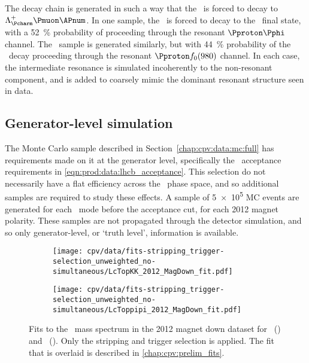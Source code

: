 The decay chain is generated in such a way that the \PLambdab\ is forced to 
decay to $\PLambdac\Pmuon\APnum$.
In one sample, the \PLambdac\ is forced to decay to the \pKK\ final state, with 
a \SI{52}{\percent} probability of proceeding through the resonant 
$\Pproton\Pphi$ channel.
The \ppipi\ sample is generated similarly, but with \SI{44}{\percent} 
probability of the \LcToppipi\ decay proceeding through the resonant $\Pproton 
f_{0}(980)$ channel.
In each case, the intermediate resonance is simulated incoherently to the 
non-resonant component, and is added to coarsely mimic the dominant resonant 
structure seen in data.

\subsection{Generator-level simulation}
\label{chap:cpv:data:mc:gen}

The Monte Carlo sample described in Section~\ref{chap:cpv:data:mc:full} has 
requirements made on it at the generator level, specifically the \lhcb\ 
acceptance requirements in \cref{eqn:prod:data:lhcb_acceptance}.
This selection do not necessarily have a flat efficiency across the \LcTophh\ 
phase space, and so additional samples are required to study these effects.
A sample of \num{5e5} \ac{MC} events are generated for each \LcTophh\ mode 
before the acceptance cut, for each 2012 magnet polarity.
These samples are not propagated through the detector simulation, and so only 
generator-level, or `truth level', information is available.

\begin{table}
  \centering
  \caption{%
    Integrated luminosity for each data sample used in the analysis.
  }
  \label{tab:cpv:data:luminosity}
  
\end{table}

\begin{figure}
  \begin{subfigure}[b]{0.5\textwidth}
    \texttt{[image: cpv/data/fits-stripping\_trigger-selection\_unweighted\_no-simultaneous/LcTopKK\_2012\_MagDown\_fit.pdf]}
    \caption{\pKK}
    \label{fig:cpv:data:mass:pKK}
  \end{subfigure}
  \begin{subfigure}[b]{0.5\textwidth}
    \texttt{[image: cpv/data/fits-stripping\_trigger-selection\_unweighted\_no-simultaneous/LcToppipi\_2012\_MagDown\_fit.pdf]}
    \caption{\ppipi}
    \label{fig:cpv:data:mass:ppipi}
  \end{subfigure}
  \caption{%
    Fits to the \PLambdac\ mass spectrum in the 2012 magnet down dataset for 
    \pKK\ () and \ppipi\ 
    ().
    Only the stripping and trigger selection is applied.
    The fit that is overlaid is described in \cref{chap:cpv:prelim_fits}.
  }
  \label{fig:cpv:data:mass}
\end{figure}
